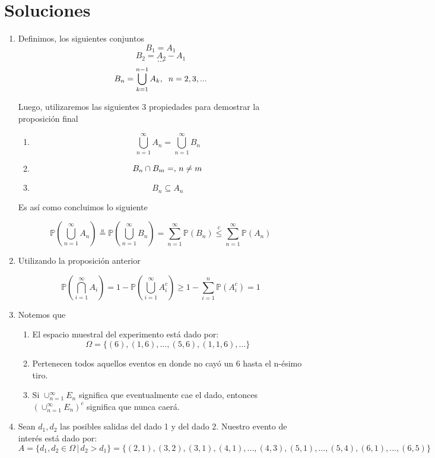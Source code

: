 \documentclass[a4paper]{article}
\begin{document}
\section*{Soluciones}
\begin{enumerate}
    \item Definimos, los siguientes conjuntos
    \[ B_1 = A_1 \]
    \[ B_2 = A_2 - A_1\]
    \[ ... \]
    \[ B_n = \bigcup_{k=1}^{n-1} A_k, \hspace{0.2cm} n =2,3,...\]
    
    Luego, utilizaremos las siguientes 3 propiedades para demostrar la proposición final
    
    \begin{enumerate}
        \item \[ \bigcup_{n=1}^\infty A_n = \bigcup_{n=1}^\infty B_n\]
        \item \[ B_n \cap B_m = \empty, \, n \neq m\]
        \item \[ B_n \subseteq A_n\]
    \end{enumerate}
    
    Es así como concluimos lo siguiente
    
    \[ \mathbb{P}(\bigcup_{n=1}^\infty A_n) \overset{a}{=} \mathbb{P}(\bigcup_{n=1}^\infty B_n) = \sum_{n=1}^\infty \mathbb{P}(B_n) \overset{c}{\le} \sum_{n=1}^\infty \mathbb{P}(A_n)\]

    \item Utilizando la proposición anterior
    
    \[ \mathbb{P}(\bigcap_{i=1}^\infty A_i) = 1- \mathbb{P}(\bigcup_{i=1}^\infty A_i^c) \ge 1- \sum_{i=1}^n \mathbb{P}(A_i^c) = 1\]
    
    \item Notemos que 
    \begin{enumerate}
        \item El espacio muestral del experimento está dado por:
        \[ \Omega = \{ (6), (1,6),...,(5,6),(1,1,6),...\}\]
        
        \item Pertenecen todos aquellos eventos en donde no cayó un 6 hasta el n-ésimo tiro.
        
        \item Si $\cup_{n=1}^\infty E_n$ significa que eventualmente cae el dado, entonces $(\cup_{n=1}^\infty E_n)^c$ significa que nunca caerá.
    \end{enumerate}
    
    \item Sean $d_1,d_2$ las posibles salidas del dado 1 y del dado 2. Nuestro evento de interés está dado por: \[ A = \{d_1,d_2 \in \Omega \,|\, d_2 > d_1 \} = \{(2,1),(3,2),(3,1),(4,1),...,(4,3),(5,1),...,(5,4),(6,1),...,(6,5)\} \]
    

\end{enumerate}
\end{document}
